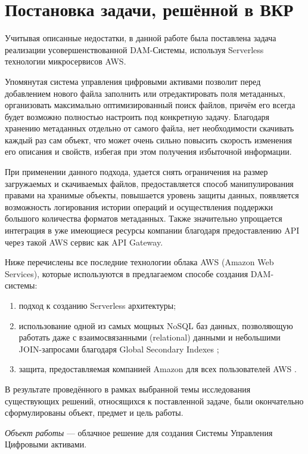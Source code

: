 \section{Постановка задачи, решённой в ВКР}

Учитывая описанные недостатки, в данной работе была поставлена задача реализации усовершенствованной DAM-Системы, используя Serverless технологии микросервисов AWS.

Упомянутая система управления цифровыми активами позволит перед добавлением нового файла заполнить или отредактировать поля метаданных, организовать максимально оптимизированный поиск файлов, причём его всегда будет возможно полностью настроить под конкретную задачу. Благодаря хранению метаданных отдельно от самого файла, нет необходимости скачивать каждый раз сам объект, что может очень сильно повысить скорость изменения его описания и свойств, избегая при этом получения избыточной информации.

При применении данного подхода, удается снять ограничения на размер загружаемых и скачиваемых файлов, предоставляется способ манипулирования  правами на хранимые объекты, повышается уровень защиты данных, появляется возможность логирования истории операций и осуществления поддержки большого количества форматов метаданных. Также значительно упрощается интеграция в уже имеющиеся ресурсы компании благодаря предоставлению API через такой AWS сервис как API Gateway.

Ниже перечислены все последние технологии облака AWS (Amazon Web Services), которые используются в предлагаемом способе создания DAM-системы:
\begin{enumerate}
  \item подход к созданию Serverless архитектуры;
  \item использование одной из самых мощных NoSQL баз данных, позволяющую работать даже с взаимосвязанными (relational) данными и небольшими JOIN-запросами благодаря Global Secondary Indexes \cite{AwsDynamoDBGsi};
  \item защита, предоставляемая компанией Amazon для всех пользователей AWS \cite{AwsSecurity}.
\end{enumerate}


В результате проведённого в рамках выбранной темы исследования существующих решений, относящихся к поставленной задаче, были окончательно сформулированы объект, предмет и цель работы.

\textit{Объект работы} --- облачное решение для создания Системы Управления Цифровыми активами.

